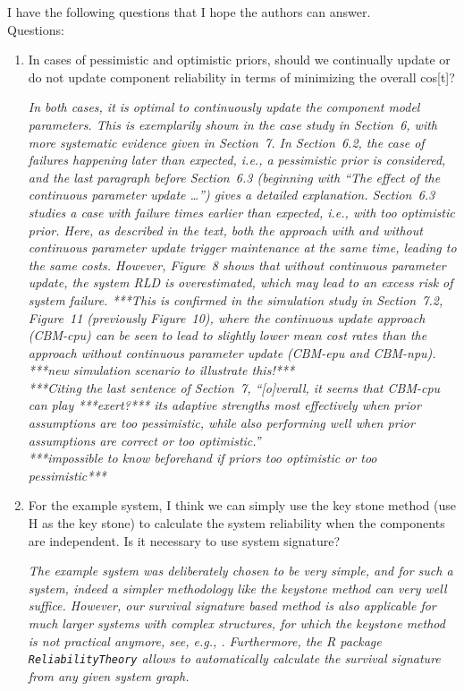 \documentclass[authoryear]{elsarticle}
\begin{document}
I have the following questions that I hope the authors can answer.\\
Questions:
\begin{enumerate}
\item In cases of pessimistic and optimistic priors, should we continually update or do not update component reliability in terms of minimizing the overall cos[t]?

\smallskip

\emph{In both cases, it is optimal to continuously update the component model parameters.
This is exemplarily shown in the case study in Section~6, with more systematic evidence given in Section~7.
In Section~6.2, the case of failures happening later than expected, i.e., a pessimistic prior is considered,
and the last paragraph before Section~6.3 (beginning with ``The effect of the continuous parameter update \ldots'')
gives a detailed explanation.
Section~6.3 studies a case with failure times earlier than expected, i.e., with too optimistic prior.
Here, as described in the text, both the approach with and without continuous parameter update
trigger maintenance at the same time, leading to the same costs.
However, Figure~8 shows that without continuous parameter update, the system RLD is overestimated,
which may lead to an excess risk of system failure.
***This is confirmed in the simulation study in Section~7.2, Figure~11 (previously Figure~10),
where the continuous update approach (CBM-cpu) can be seen to lead to slightly lower mean cost rates
than the approach without continuous parameter update (CBM-epu and CBM-npu).\\
%
***new simulation scenario to illustrate this!***\\
%
***Citing the last sentence of Section~7,
``[o]verall, it seems that CBM-cpu can play ***exert?*** its adaptive strengths most effectively
when prior assumptions are too pessimistic,
while also performing well when prior assumptions are correct or too optimistic.''\\
%
***impossible to know beforehand if priors too optimistic or too pessimistic***}
%
\item For the example system, I think we can simply use the key stone method (use H as the key stone) to calculate the system reliability when the components are independent.  Is it necessary to use system signature? 

\smallskip

\emph{The example system was deliberately chosen to be very simple,
and for such a system, indeed a simpler methodology like the keystone method can very well suffice.
However, our survival signature based method is also applicable for much larger systems with complex structures,
for which the keystone method is not practical anymore,
see, e.g., \citet[Table~2]{2017:reed}.
Furthermore, the \textsf{R} package \texttt{ReliabilityTheory} allows to automatically calculate the
survival signature from any given system graph.}
\end{enumerate}
\end{document}
